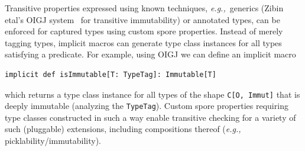 \documentclass[runningheads]{llncs}
\newcommand{\eg}{{\em e.g.,~}}
\begin{document}
\begin{sloppypar}
Transitive properties expressed using known techniques, \eg generics (Zibin
etal's OIGJ system~\cite{ZibinPLAE10} for transitive immutability) or annotated types, can be
enforced for captured types using custom spore properties. Instead of merely
tagging types, implicit macros can generate type class instances for all types
satisfying a predicate. For example, using OIGJ we can define an implicit macro

\begin{lstlisting}[numbers=none]
implicit def isImmutable[T: TypeTag]: Immutable[T]
\end{lstlisting}

which returns a type class instance for all types of the shape \verb|C[O, Immut]|
that is deeply immutable (analyzing the \verb|TypeTag|). Custom spore properties
requiring type classes constructed in such a way enable transitive checking for
a variety of such (pluggable) extensions, including compositions thereof (\eg
picklability/immutability).







\end{sloppypar}
\end{document}
